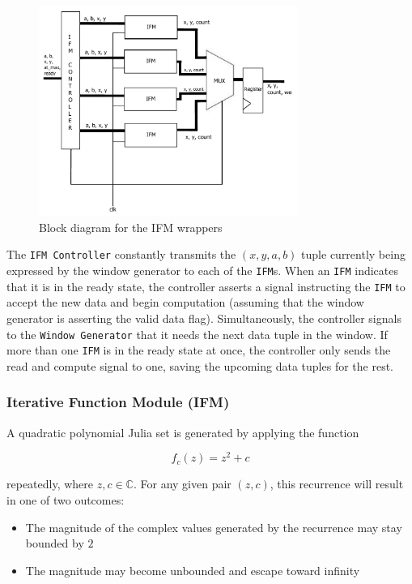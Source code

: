 \documentclass{article}
\begin{document}
\begin{figure}
  \centering
    \includegraphics[width=240pt]{block_diagrams/ifmunit.pdf}
  \caption{Block diagram for the IFM wrappers}
\end{figure}


The \texttt{IFM Controller} constantly transmits the $(x, y, a, b)$ tuple currently being expressed by the window generator to each of the \texttt{IFM}s. When an \texttt{IFM} indicates that it is in the ready state, the controller asserts a signal instructing the 
\texttt{IFM} to accept the new data and begin computation (assuming that the window generator is asserting the valid data flag).
Simultaneously, the controller signals to the \texttt{Window Generator} that it needs the next data tuple in the window. If more
than one \texttt{IFM} is in the ready state at once, the controller only sends the read and compute signal to one, saving the upcoming data tuples for the rest.


\subsubsection{Iterative Function Module (IFM)}

A quadratic polynomial Julia set is generated by applying the function

\begin{equation}
f_c(z) = z^2 + c
\end{equation}

repeatedly, where $z,c \in \mathbb{C}$. For any given pair $(z, c)$, this recurrence will result in one of two outcomes:
\begin{itemize}
\item The magnitude of the complex values generated by the recurrence may stay bounded by $2$
\item The magnitude may become unbounded and escape toward infinity
\end{itemize}
\end{document}
